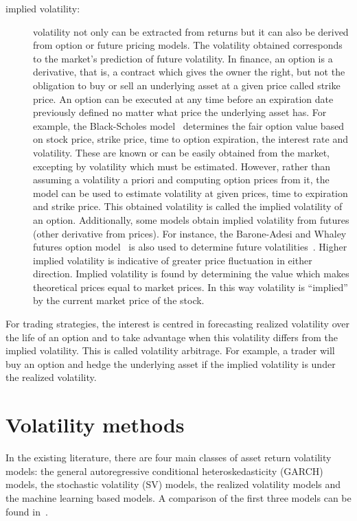 \begin{description}
\item[implied volatility:] volatility not only can be extracted from returns but it can also be derived from option or future pricing models.  The volatility obtained corresponds to the market's prediction of future volatility. In finance, an option is a derivative, that is, a contract which gives the owner the right, but not the obligation to buy or sell an underlying asset at a given price called strike price. An option can be executed at any time before an expiration date previously defined no matter what price the underlying asset has. For example, the Black-Scholes model~\cite{black1973} determines the fair option value based on stock price, strike price, time to option expiration, the interest rate and volatility. These are known or can be easily obtained from the market, excepting by volatility which must be estimated. However, rather than assuming a volatility a priori and computing option prices from it, the model can be used to estimate volatility at given prices, time to expiration and strike 
price. This obtained volatility is called the implied volatility of an option. Additionally, some models obtain implied volatility from futures (other derivative from prices). For instance, the Barone-Adesi and Whaley futures option model~\cite{baroneetal1987} is also used to determine future volatilities~\cite{hamidetal2004}. Higher implied volatility is indicative of greater price fluctuation in either direction. Implied volatility is found by determining the value which makes theoretical prices equal to market prices. In this way volatility is ``implied'' by the current market price of the stock.

\end{description}


For trading strategies, the interest is centred in forecasting realized volatility over the life of an option and to take advantage when this volatility differs from the implied volatility. This is called volatility arbitrage. For example, a trader will buy an option and hedge the underlying asset if the implied volatility is under the realized volatility. 


\section{Volatility methods}

In the existing literature, there are four main classes of asset
return volatility models: the general autoregressive conditional
heteroskedasticity (GARCH) models, the stochastic volatility (SV)
models, the realized volatility models and the machine learning based
models. A comparison of the first three models can be found
in~\cite{wei2012}. 

